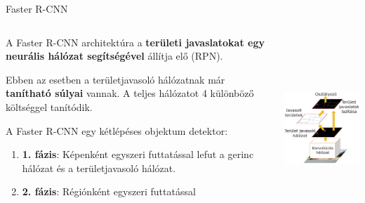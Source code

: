 \documentclass[english, aspectratio=169]{beamer}
\begin{document}
	\begin{frame}{Faster R-CNN}
		\begin{columns}
			\begin{column}{.5\textwidth}
				A Faster R-CNN architektúra a \textbf{területi javaslatokat egy neurális hálózat segítségével} állítja elő (RPN).\par\smallskip
				Ebben az esetben a területjavasoló hálózatnak már \textbf{tanítható súlyai} vannak. A teljes hálózatot 4 különböző költséggel tanítódik.\par\smallskip
				A Faster R-CNN egy kétlépéses objektum detektor:
				\begin{enumerate}
					\item \textbf{1. fázis}: Képenként egyszeri futtatással lefut a gerinc hálózat és a területjavasoló hálózat. 
					\item \textbf{2. fázis}: Régiónként egyszeri futtatással 
				\end{enumerate}
			\end{column}
			\begin{column}{.5\textwidth}
				\begin{center}
					\includegraphics[width=6cm, height=7cm, keepaspectratio]{images/od_15.png}
				\end{center}
			\end{column}
		\end{columns}
	\end{frame}
	
\end{document}
